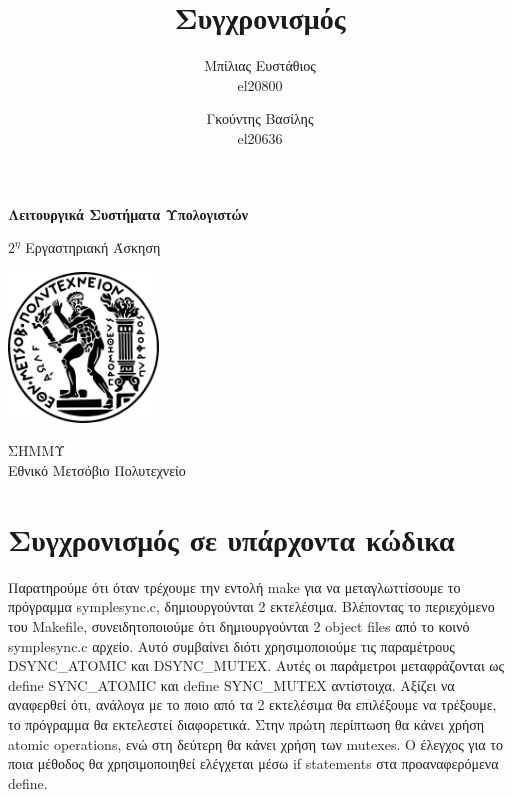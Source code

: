 \documentclass[12pt]{article}
\begin{document}
\author{
    Μπίλιας Ευστάθιος
    \\el20800
    \and
    Γκούντης Βασίλης
    \\el20636
}


\title{Συγχρονισμός}

\begin{titlepage}
    \begin{center}

        \Huge
        \textbf{Λειτουργικά Συστήματα Υπολογιστών}

        \vspace{0.5cm}
        \LARGE
        $2^η$ Εργαστηριακή Άσκηση      

        \vspace{0.3cm}
        {\vspace{-2em}\let\newpage\relax\maketitle\vspace{-2em}}

        \vspace{0.8cm}

        \includegraphics[width=0.3\textwidth]{logo.png}

        \vspace{0.8cm}
        \Large
        ΣΗΜΜΥ\\
        Εθνικό Μετσόβιο Πολυτεχνείο\\

    \end{center}
\end{titlepage}

\tableofcontents
\setcounter{page}{2}
\pagebreak

\section{Συγχρονισμός σε υπάρχοντα κώδικα}

Παρατηρούμε ότι όταν τρέχουμε την εντολή make για να μεταγλωττίσουμε το πρόγραμμα symplesync.c, 
δημιουργούνται 2 εκτελέσιμα. Βλέποντας το περιεχόμενο του Makefile, συνειδητοποιούμε ότι δημιουργούνται 
2 object files από το κοινό symplesync.c αρχείο. Αυτό συμβαίνει διότι χρησιμοποιούμε τις παραμέτρους 
DSYNC\_ATOMIC και DSYNC\_MUTEX. Αυτές οι παράμετροι μεταφράζονται ως define SYNC\_ATOMIC και define 
SYNC\_MUTEX αντίστοιχα. Αξίζει να αναφερθεί ότι, ανάλογα με το ποιο από τα 2 εκτελέσιμα θα επιλέξουμε 
να τρέξουμε, το πρόγραμμα θα εκτελεστεί διαφορετικά. Στην πρώτη περίπτωση θα κάνει χρήση atomic 
operations, ενώ στη δεύτερη θα κάνει χρήση των mutexes. Ο έλεγχος για το ποια μέθοδος θα 
χρησιμοποιηθεί ελέγχεται μέσω if statements στα προαναφερόμενα define.
\end{document}
